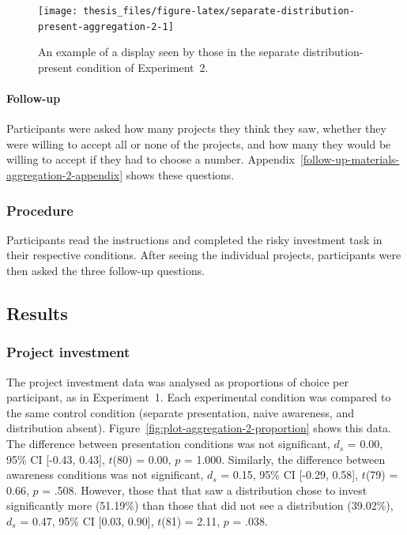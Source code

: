 \documentclass[a4paper, nobind, dvipsnames]{templates/ociamthesis}
\theoremstyle{definition}
\theoremstyle{definition}
\theoremstyle{definition}
\theoremstyle{definition}
\theoremstyle{remark}
\begin{document}
\begin{figure}
\texttt{[image: thesis\_files/figure-latex/separate-distribution-present-aggregation-2-1]} \caption{An example of a display seen by those in the separate distribution-present condition of Experiment~2.}\label{fig:separate-distribution-present-aggregation-2}
\end{figure}

\hypertarget{follow-up-aggregation-2}{%
\paragraph{Follow-up}\label{follow-up-aggregation-2}}

Participants were asked how many projects they think they saw, whether they were
willing to accept all or none of the projects, and how many they would be
willing to accept if they had to choose a number.
Appendix~\ref{follow-up-materials-aggregation-2-appendix} shows these
questions.

\subsubsection{Procedure}

Participants read the instructions and completed the risky investment task in
their respective conditions. After seeing the individual projects, participants
were then asked the three follow-up questions.

\hypertarget{results-aggregation-2}{%
\subsection{Results}\label{results-aggregation-2}}

\subsubsection{Project investment}

The project investment data was analysed as proportions of choice per
participant, as in Experiment~1. Each experimental condition was compared to the
same control condition (separate presentation, naive awareness, and distribution
absent). Figure~\ref{fig:plot-aggregation-2-proportion} shows this data. The
difference between presentation conditions was not significant,
\(d_s\) = 0.00, 95\% CI {[}-0.43, 0.43{]}, \(t\)(80) = 0.00, \(p\) = 1.000. Similarly, the
difference between awareness conditions was not significant,
\(d_s\) = 0.15, 95\% CI {[}-0.29, 0.58{]}, \(t\)(79) = 0.66, \(p\) = .508. However, those that that saw a
distribution chose to invest significantly more
(51.19\%) than those that did
not see a distribution
(39.02\%),
\(d_s\) = 0.47, 95\% CI {[}0.03, 0.90{]}, \(t\)(81) = 2.11, \(p\) = .038.
\end{document}
